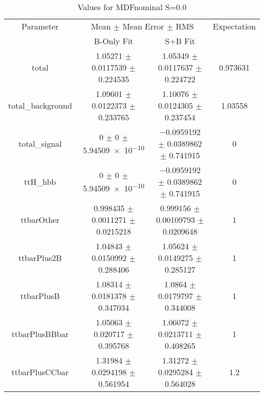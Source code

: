 \begin{table}
\centering
\caption{Values for MDFnominal S=0.0}
\begin{tabular}{cccc}
\toprule
Parameter & \multicolumn{2}{c}{Mean $\pm$ Mean Error $\pm$ RMS} & Expectation\\
 & B-Only Fit & S+B Fit & \\
\midrule
total & \num{1.05271} $\pm$ \num{0.0117539} $\pm$ \num{0.224535} & \num{1.05349} $\pm$ \num{0.0117637} $\pm$ \num{0.224722} & \num{0.973631}\\
total\_background & \num{1.09601} $\pm$ \num{0.0122373} $\pm$ \num{0.233765} & \num{1.10076} $\pm$ \num{0.0124305} $\pm$ \num{0.237454} & \num{1.03558}\\
total\_signal & \num{0} $\pm$ \num{0} $\pm$ \num{5.94509e-10} & \num{-0.0959192} $\pm$ \num{0.0389862} $\pm$ \num{0.741915} & \num{0}\\
ttH\_hbb & \num{0} $\pm$ \num{0} $\pm$ \num{5.94509e-10} & \num{-0.0959192} $\pm$ \num{0.0389862} $\pm$ \num{0.741915} & \num{0}\\
ttbarOther & \num{0.998435} $\pm$ \num{0.0011271} $\pm$ \num{0.0215218} & \num{0.999156} $\pm$ \num{0.00109793} $\pm$ \num{0.0209648} & \num{1}\\
ttbarPlus2B & \num{1.04843} $\pm$ \num{0.0150992} $\pm$ \num{0.288406} & \num{1.05624} $\pm$ \num{0.0149275} $\pm$ \num{0.285127} & \num{1}\\
ttbarPlusB & \num{1.08314} $\pm$ \num{0.0181378} $\pm$ \num{0.347034} & \num{1.0864} $\pm$ \num{0.0179797} $\pm$ \num{0.344008} & \num{1}\\
ttbarPlusBBbar & \num{1.05063} $\pm$ \num{0.020717} $\pm$ \num{0.395768} & \num{1.06072} $\pm$ \num{0.0213711} $\pm$ \num{0.408265} & \num{1}\\
ttbarPlusCCbar & \num{1.31984} $\pm$ \num{0.0294198} $\pm$ \num{0.561954} & \num{1.31272} $\pm$ \num{0.0295284} $\pm$ \num{0.564028} & \num{1.2}\\
\bottomrule
\end{tabular}
\end{table}